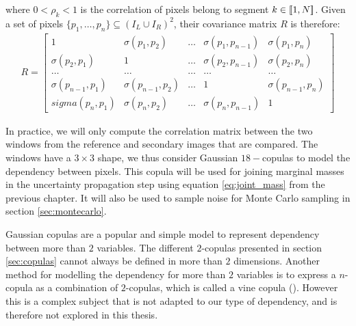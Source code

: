 where $0<\rho_k<1$ is the correlation of pixels belong to segment $k\in{[\![} 1, N{]\!]}$. Given a set of pixels $\{p_1, \dots, p_n\}\subseteq(I_L\cup I_R)^2$, their covariance matrix $R$ is therefore:
\begin{align}
    R = \begin{bmatrix}
            1 & \sigma(p_{1}, p_{2}) & \dots & \sigma(p_{1}, p_{n-1}) & \sigma(p_{1}, p_{n})\\
            \sigma(p_{2}, p_{1}) & 1 & \dots & \sigma(p_{2}, p_{n-1}) & \sigma(p_{2}, p_{n})\\
            \dots & \dots & \dots & \dots & \dots\\
            \sigma(p_{n-1}, p_{1}) & \sigma(p_{n-1}, p_{2}) & \dots & 1 & \sigma(p_{n-1}, p_{n})\\
            sigma(p_{n}, p_{1}) & \sigma(p_{n}, p_{2}) & \dots & \sigma(p_{n}, p_{n-1}) & 1
        \end{bmatrix}
\end{align}

In practice, we will only compute the correlation matrix between the two windows from the reference and secondary images that are compared. The windows have a $3\times 3$ shape, we thus consider Gaussian $18-$copulas to model the dependency between pixels. This copula will be used for joining marginal masses in the uncertainty propagation step using equation \eqref{eq:joint_mass} from the previous chapter. It will also be used to sample noise for Monte Carlo sampling in section \ref{sec:montecarlo}.

\begin{remark}
    Gaussian copulas are a popular and simple model to represent dependency between more than $2$ variables. The different $2$-copulas presented in section \ref{sec:copulas} cannot always be defined in more than $2$ dimensions. Another method for modelling the dependency for more than $2$ variables is to express a $n$-copula as a combination of $2$-copulas, which is called a vine copula (\cite{czado_vine_2022}). However this is a complex subject that is not adapted to our type of dependency, and is therefore not explored in this thesis.
\end{remark}

